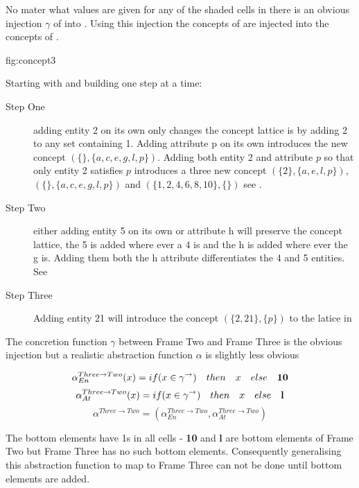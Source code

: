 No mater what values are given for any of the shaded cells in  there is an obvious injection $\gamma$  of  into . Using this injection the concepts of  are injected into the concepts of  .  

 

 {fig:concept3}

Starting with  and building  one step at a time:
\begin{description}
\item[ Step One] 
 adding entity 2 on its own  only changes the  concept lattice is by adding 2 to any set containing 1. Adding attribute p on its own introduces  the new concept $(\{\},\{a,c,e,g,l,p\})$.  Adding both entity 2 and attribute $p$ so that only entity 2 satisfies $p$ introduces a three new concept $(\{2\},\{a,e,l,p\})$, $(\{\},\{a,c,e,g,l,p\})$  and $(\{1,2,4,6,8,10\},\{\})$ see .

\item[Step Two] either adding  entity 5 on its own or attribute h will preserve the concept lattice, the 5 is added where ever a 4 is and the h is added where ever  the g is. Adding them both the h attribute differentiates the 4 and 5 entities. See 

\item [Step Three]  Adding entity 21 will introduce the concept $(\{2,21\},\{p\})$ to the latice in 
\end{description}

The concretion function $\gamma$ between Frame Two and Frame Three is the obvious injection but a realistic  abstraction function $\alpha$ is slightly less obvious

\[ \alpha_{En}^{Three \rightarrow Two}(x) = if (x\in \gamma^{\rightarrow}) \quad then \quad x\quad  else \quad {\bf 10} \]
\[ \alpha_{At}^{Three\rightarrow Two}(x) = if (x\in \gamma^{\rightarrow}) \quad then \quad x\quad  else \quad {\bf l} \]
\[\alpha^{Three\rightarrow Two} = (\alpha_{En}^{Three \rightarrow Two},\alpha_{At}^{Three \rightarrow Two}) \]


The bottom elements have 1s in all cells - {\bf 10} and {\bf l} are bottom elements of Frame Two but Frame Three has no such bottom elements. Consequently generalising this abstraction function to map to Frame Three can not be done until bottom elements are added. 

